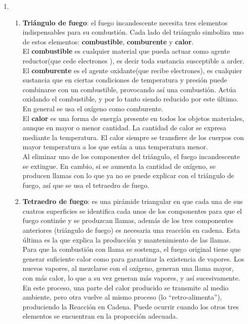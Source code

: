 \begin{enumerate}
  \item  %
  \begin{enumerate}
      \item \textbf{Triángulo de fuego}: el fuego incandescente necesita tres elementos indispensables para su combustión. Cada lado del triángulo simboliza uno de estos elementos: \textbf{combustible}, \textbf{comburente} y \textbf{calor}.
      \\El \textbf{combustible} es cualquier material que pueda actuar como agente reductor(que cede electrones ), es decir toda sustancia susceptible a arder. 
      \\El \textbf{comburente }es el agente oxidante(que recibe electrones), es cualquier sustancia que en ciertas condiciones de temperatura y presión puede combinarse con un combustible, provocando así una combustión. Actúa oxidando el combustible, y por lo tanto siendo reducido por este último. En general se usa el oxígeno como comburente. 
      \\El \textbf{calor} es una forma de energía presente en todos los objetos materiales, aunque en mayor o menor cantidad. La cantidad de calor se expresa mediante la temperatura. El calor siempre se transfiere de los cuerpos con mayor temperatura a los que están a una temperatura menor. 
      \\Al eliminar uno de los componentes del triángulo, el fuego incandescente se extingue. En cambio, si se aumenta la cantidad de oxígeno, se producen llamas con lo que ya no se puede explicar con el triángulo de fuego, así que se usa el tetraedro de fuego. 
      \item \textbf{Tetraedro de fuego}: es una pirámide triangular en que cada una de sus cuatros superficies se identifica cada unos de los componentes para que el fuego continúe y se produzcan llamas, además de los tres componentes anteriores (triángulo de fuego) es necesaria una reacción en cadena. Esta última es la que explica la producción y mantenimiento de las llamas.  
    \\Para que la combustión con llama se sostenga, el fuego original tiene que generar suficiente calor como para garantizar la existencia de vapores. Los nuevos vapores, al mezclarse con el oxígeno, generan una llama mayor, con más calor, lo que a su vez generan más vapores, y así sucesivamente. En este proceso, una parte del calor producido se transmite al medio ambiente, pero otra vuelve al mismo proceso (lo “retro-alimenta”), produciendo la Reacción en Cadena. Puede ocurrir cuando los otros tres elementos se encuentran en la proporción adecuada.	
  \end{enumerate}
  

\end{enumerate}
